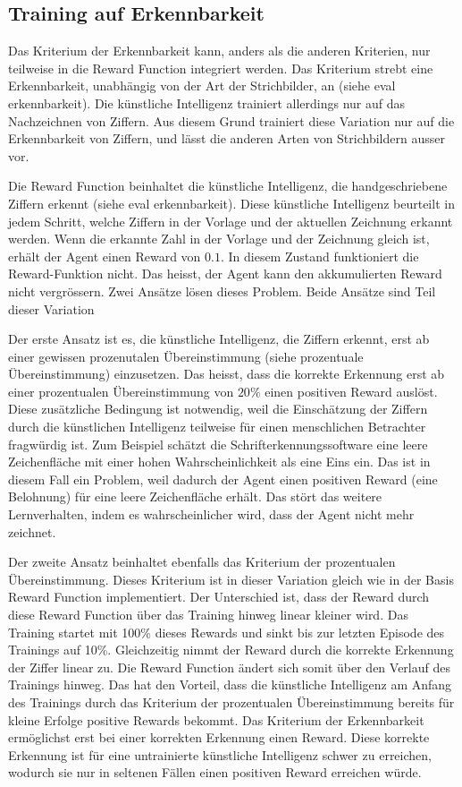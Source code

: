\subsection{Training auf Erkennbarkeit}
\label{sub:m_var_rec}
Das Kriterium der Erkennbarkeit kann, anders als die anderen Kriterien, nur
teilweise in die Reward Function integriert werden. Das Kriterium strebt eine
Erkennbarkeit, unabhängig von der Art der Strichbilder, an (siehe eval
erkennbarkeit). Die künstliche Intelligenz trainiert allerdings nur auf das
Nachzeichnen von Ziffern. Aus diesem Grund trainiert diese Variation nur auf die
Erkennbarkeit von Ziffern, und lässt die anderen Arten von Strichbildern ausser
vor. 

Die Reward Function beinhaltet die künstliche Intelligenz, die handgeschriebene
Ziffern erkennt (siehe eval erkennbarkeit). Diese künstliche Intelligenz
beurteilt in jedem Schritt, welche Ziffern in der Vorlage und der aktuellen
Zeichnung erkannt werden. Wenn die erkannte Zahl in der Vorlage und der
Zeichnung gleich ist, erhält der Agent einen Reward von $0.1$. In diesem Zustand     %
funktioniert die Reward-Funktion nicht. Das heisst, der Agent kann den
akkumulierten Reward nicht vergrössern. Zwei Ansätze lösen dieses Problem. Beide
Ansätze sind Teil dieser Variation

Der erste Ansatz ist es, die künstliche Intelligenz, die Ziffern erkennt, erst
ab einer gewissen prozenutalen Übereinstimmung (siehe prozentuale
Übereinstimmung) einzusetzen. Das heisst, dass die korrekte Erkennung erst ab
einer prozentualen Übereinstimmung von $20\%$ einen positiven Reward auslöst.
Diese zusätzliche Bedingung ist notwendig, weil die Einschätzung der Ziffern
durch die künstlichen Intelligenz teilweise für einen menschlichen Betrachter
fragwürdig ist. Zum Beispiel schätzt die Schrifterkennungssoftware eine leere
Zeichenfläche mit einer hohen Wahrscheinlichkeit als eine Eins ein. Das ist in
diesem Fall ein Problem, weil dadurch der Agent einen positiven Reward (eine
Belohnung) für eine leere Zeichenfläche erhält. Das stört das weitere
Lernverhalten, indem es wahrscheinlicher wird, dass der Agent nicht mehr
zeichnet. 

Der zweite Ansatz beinhaltet ebenfalls das Kriterium der prozentualen
Übereinstimmung. Dieses Kriterium ist in dieser Variation gleich wie in der
Basis Reward Function implementiert. Der Unterschied ist, dass der Reward durch
diese Reward Function über das Training hinweg linear kleiner wird. Das Training
startet mit 100\% dieses Rewards und sinkt bis zur letzten Episode des Trainings
auf 10\%. Gleichzeitig nimmt der Reward durch die korrekte Erkennung der Ziffer
linear zu. Die Reward Function ändert sich somit über den Verlauf des Trainings
hinweg. Das hat den Vorteil, dass die künstliche Intelligenz am Anfang des
Trainings durch das Kriterium der prozentualen Übereinstimmung bereits für
kleine Erfolge positive Rewards bekommt. Das Kriterium der Erkennbarkeit
ermöglichst erst bei einer korrekten Erkennung einen Reward. Diese korrekte
Erkennung ist für eine untrainierte künstliche Intelligenz schwer zu erreichen,
wodurch sie nur in seltenen Fällen einen positiven Reward erreichen würde.


